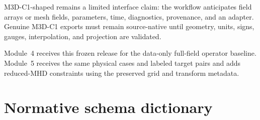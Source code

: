 \documentclass[11pt]{article}
\begin{document}
M3D-C1-shaped remains a limited interface claim: the workflow anticipates field arrays or mesh fields, parameters, time, diagnostics, provenance, and an adapter. Genuine M3D-C1 exports must remain source-native until geometry, units, signs, gauges, interpolation, and projection are validated.

Module~4 receives this frozen release for the data-only full-field operator baseline. Module~5 receives the same physical cases and labeled target pairs and adds reduced-MHD constraints using the preserved grid and transform metadata.

\clearpage
\appendix

\section{Normative schema dictionary}
\label{app:dictionary}
\end{document}
